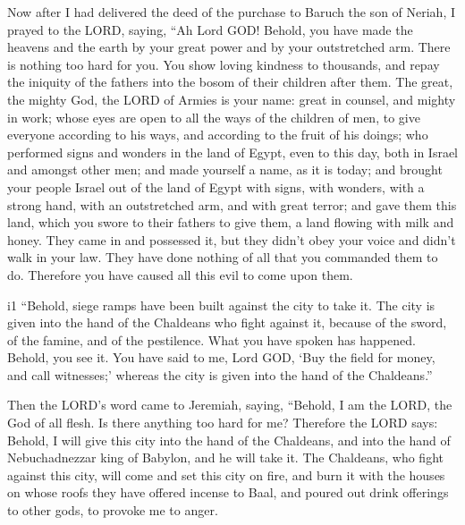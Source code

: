 Now after I had delivered the deed of the purchase to
Baruch the son of Neriah, I prayed to the LORD, saying, 
``Ah Lord GOD! Behold, you have made the heavens and the earth by your
great power and by your outstretched arm. There is nothing too hard for
you.  You show loving kindness to thousands, and repay
the iniquity of the fathers into the bosom of their children after them.
The great, the mighty God, the LORD of Armies is your name:
 great in counsel, and mighty in work; whose eyes are
open to all the ways of the children of men, to give everyone according
to his ways, and according to the fruit of his doings; 
who performed signs and wonders in the land of Egypt, even to this day,
both in Israel and amongst other men; and made yourself a name, as it is
today;  and brought your people Israel out of the land of
Egypt with signs, with wonders, with a strong hand, with an outstretched
arm, and with great terror;  and gave them this land,
which you swore to their fathers to give them, a land flowing with milk
and honey.  They came in and possessed it, but they
didn't obey your voice and didn't walk in your law. They have done
nothing of all that you commanded them to do. Therefore you have caused
all this evil to come upon them.

i1 ``Behold, siege ramps have been built against the city
to take it. The city is given into the hand of the Chaldeans who fight
against it, because of the sword, of the famine, and of the pestilence.
What you have spoken has happened. Behold, you see it. 
You have said to me, Lord GOD, `Buy the field for money, and call
witnesses;' whereas the city is given into the hand of the Chaldeans.''

 Then the LORD's word came to Jeremiah, saying,
 ``Behold, I am the LORD, the God of all flesh. Is there
anything too hard for me?  Therefore the LORD says:
Behold, I will give this city into the hand of the Chaldeans, and into
the hand of Nebuchadnezzar king of Babylon, and he will take it.
 The Chaldeans, who fight against this city, will come
and set this city on fire, and burn it with the houses on whose roofs
they have offered incense to Baal, and poured out drink offerings to
other gods, to provoke me to anger.

